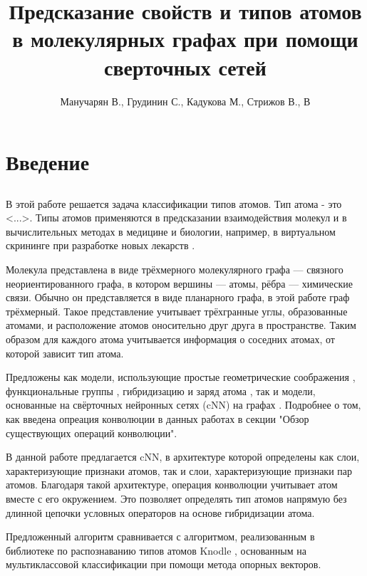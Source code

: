 \documentclass[12pt,twoside]{article}
\title
    [] %
    {Предсказание свойств и типов атомов в молекулярных графах при помощи сверточных сетей}
\author
    [] %
    {Манучарян В., Грудинин С., Кадукова М., Стрижов В., В} %
    [Манучарян В., Грудинин С., Кадукова М., Стрижов В., В] %
\begin{document}
\maketitle
\section{Введение}
\subsection{}
	В этой работе решается задача классификации типов атомов. Тип атома - это <...>. Типы атомов применяются в предсказании взаимодействия молекул и в вычислительных методах в медицине и биологии, например, в виртуальном скрининге при разработке новых лекарств \cite{article2}.
	
	Молекула представлена в виде трёхмерного молекулярного графа --- связного неориентированного графа, в котором вершины --- атомы, рёбра --- химические связи. Обычно он представляется в виде планарного графа, в этой работе граф трёхмерный. Такое представление учитывает трёхгранные углы, образованные атомами, и расположение атомов оносительно друг друга в пространстве. Таким образом для каждого атома учитывается информация о соседних атомах, от которой зависит тип атома.
	
	Предложены как модели, использующие простые геометрические соображения \cite{article3}, функциональные группы \cite{article4}, гибридизацию и заряд атома \cite{article5,article6,article7,article8}, так и модели, основанные на свёрточных нейронных сетях (cNN) на графах \cite{article15,article16,article20}. Подробнее о том, как введена опреация конволюции в данных работах в секции "Обзор существующих операций конволюции".
	
	В данной работе предлагается cNN, в архитектуре которой определены как слои, характеризующие признаки атомов, так и слои, характеризующие признаки пар атомов. Благодаря такой архитектуре, операция конволюции учитывает атом вместе с его окружением. Это позволяет определять тип атомов напрямую без длинной цепочки условных операторов на основе гибридизации атома.
	
	Предложенный алгоритм сравнивается с алгоритмом, реализованным в библиотеке по распознаванию типов атомов Knodle \cite{article1}, основанным на мультиклассовой классификации при помощи метода опорных векторов.
	
\end{document}
